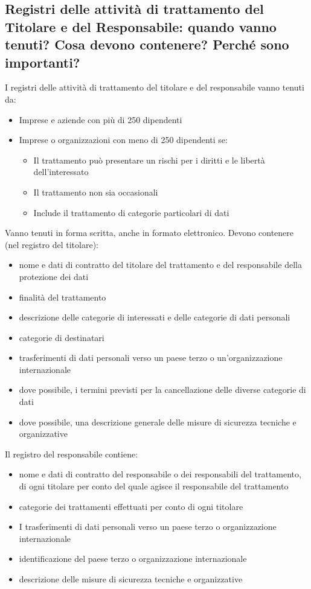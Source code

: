 \subsection{Registri delle attività di trattamento del Titolare e del Responsabile: quando vanno tenuti?
Cosa devono contenere? Perché sono importanti?}

I registri delle attività di trattamento del titolare e del responsabile vanno tenuti da:
\begin{itemize}
    \item Imprese e aziende con più di 250 dipendenti
    \item Imprese o organizzazioni con meno di 250 dipendenti se:
    \begin{itemize}
        \item Il trattamento può presentare un rischi per i diritti e le libertà dell'interessato
        \item Il trattamento non sia occasionali
        \item Include il trattamento di categorie particolari di dati
    \end{itemize}
\end{itemize}

Vanno tenuti in forma scritta, anche in formato elettronico.
Devono contenere (nel registro del titolare):
\begin{itemize}
    \item nome e dati di contratto del titolare del trattamento e del responsabile della protezione dei dati
    \item finalità del trattamento
    \item descrizione delle categorie di interessati e delle categorie di dati personali
    \item categorie di destinatari
    \item trasferimenti di dati personali verso un paese terzo o un'organizzazione internazionale
    \item dove possibile, i termini previsti per la cancellazione delle diverse categorie di dati
    \item dove possibile, una descrizione generale delle misure di sicurezza tecniche e organizzative
\end{itemize}
Il registro del responsabile contiene:
\begin{itemize}
    \item nome e dati di contratto del responsabile o dei responsabili del
        trattamento, di ogni titolare per conto del quale agisce il
        responsabile del trattamento
    \item categorie dei trattamenti effettuati per conto di ogni titolare
    \item I trasferimenti di dati personali verso un paese terzo o
        organizzazione internazionale
    \item identificazione del paese terzo o organizzazione internazionale
    \item descrizione delle misure di sicurezza tecniche e organizzative
\end{itemize}

